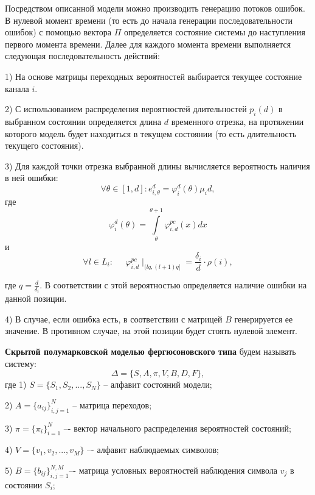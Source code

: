 \documentclass[twoside,12pt]{article}
\begin{document}
Посредством описанной модели можно производить генерацию потоков ошибок. В нулевой момент времени (то есть до начала генерации последовательности ошибок) с помощью вектора $\Pi$ определяется состояние системы до наступления первого момента времени. Далее для каждого момента времени выполняется следующая последовательность действий:

1) На основе матрицы переходных вероятностей выбирается текущее состояние канала $i$.

2) С использованием распределения вероятностей длительностей $p_i(d)$ в выбранном состоянии определяется длина $d$ временного отрезка, на протяжении которого модель будет находиться в текущем состоянии (то есть длительность текущего состояния).

3) Для каждой точки отрезка выбранной длины вычисляется вероятность наличия в ней ошибки:
\begin{equation}
\label{eq_error_prob}
\forall \theta \in [1,d]: e_{i,\theta}^d = \varphi_i^d(\theta)\mu_i d,
\end{equation}
где
\begin{equation}
\label{eq_varphi}
\varphi_i^d(\theta) = \int\limits_{\theta}^{\theta+1} \varphi_{i,d}^{pc}(x)dx
\end{equation}
и
$$\forall l\in L_i: \;\;\;\;\; \varphi_{i,d}^{pc}\mid _{(lq,(l+1)q]}=\frac{\delta_i}{d}\cdot \rho(i),$$

\noindent где $q=\frac{d}{\delta_i}$. В соответствии с этой вероятностью определяется наличие ошибки на данной позиции.

4) В случае, если ошибка есть, в соответствии с матрицей $B$ генерируется ее значение. В противном случае, на этой позиции будет стоять нулевой элемент.

\textbf{Скрытой полумарковской моделью фергюсоновского типа} будем называть систему:
\begin{equation}\label{chapt2_Ferguson_model:def} \Delta =\{S,A,\pi,V,B,D,F\},\end{equation}
где
1) $S=\{S_1,S_2,...,S_N\}$ -- алфавит состояний модели;

2) $A=\{a_{ij}\}_{i,j=1}^N$ -- матрица переходов;

3) $\pi=\{\pi_i \}_{i=1}^N$ –- вектор начального распределения вероятностей состояний;

4) $V=\{v_1,v_2,...,v_M\}$ –- алфавит наблюдаемых символов;

5) $B=\{b_{ij}\}_{i,j=1}^{N,M}$–- матрица условных вероятностей наблюдения символа $v_j$ в состоянии $S_i$;
\end{document}
